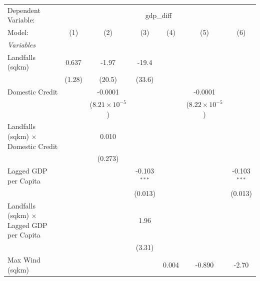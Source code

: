 
\begingroup
\centering
\begin{tabular}{lcccccc}
   \tabularnewline \midrule \midrule
   Dependent Variable: & \multicolumn{6}{c}{gdp\_diff}\\
   Model:                                           & (1)     & (2)                     & (3)            & (4)     & (5)                     & (6)\\  
   \midrule
   \emph{Variables}\\
   Landfalls (sqkm)                                 & 0.637   & -1.97                   & -19.4          &         &                         &   \\   
                                                    & (1.28)  & (20.5)                  & (33.6)         &         &                         &   \\   
   Domestic Credit                                  &         & -0.0001                 &                &         & -0.0001                 &   \\   
                                                    &         & ($8.21\times 10^{-5}$)  &                &         & ($8.22\times 10^{-5}$)  &   \\   
   Landfalls (sqkm) $\times$ Domestic Credit        &         & 0.010                   &                &         &                         &   \\   
                                                    &         & (0.273)                 &                &         &                         &   \\   
   Lagged GDP per Capita                            &         &                         & -0.103$^{***}$ &         &                         & -0.103$^{***}$\\   
                                                    &         &                         & (0.013)        &         &                         & (0.013)\\   
   Landfalls (sqkm) $\times$ Lagged GDP per Capita  &         &                         & 1.96           &         &                         &   \\   
                                                    &         &                         & (3.31)         &         &                         &   \\   
   Max Wind (sqkm)                                  &         &                         &                & 0.004   & -0.890                  & -2.70\\   

\end{tabular}
